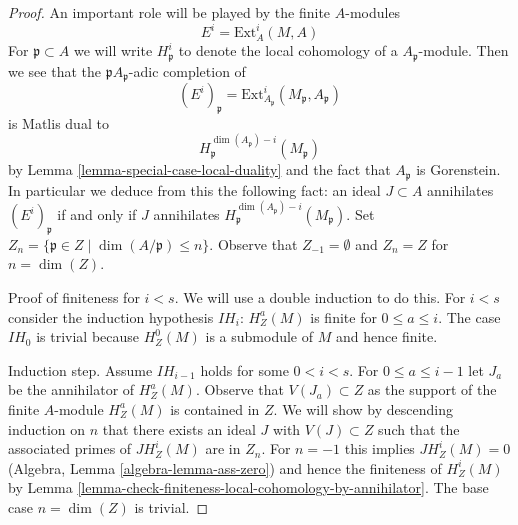 \begin{proof}
An important role will be played by the finite $A$-modules
$$
E^i = \text{Ext}_A^i(M, A)
$$
For $\mathfrak p \subset A$ we will write $H^i_\mathfrak p$ to denote the
local cohomology of a $A_\mathfrak p$-module. Then we see that
the $\mathfrak pA_\mathfrak p$-adic completion of
$$
(E^i)_\mathfrak p = \text{Ext}^i_{A_\mathfrak p}(M_\mathfrak p, A_\mathfrak p)
$$
is Matlis dual to
$$
H^{\dim(A_\mathfrak p) - i}_{\mathfrak p}(M_\mathfrak p)
$$
by Lemma \ref{lemma-special-case-local-duality} and the fact that
$A_\mathfrak p$ is Gorenstein. In particular we deduce from this the
following fact: an ideal $J \subset A$ annihilates
$(E^i)_\mathfrak p$ if and only if $J$ annihilates
$H^{\dim(A_\mathfrak p) - i}_{\mathfrak p}(M_\mathfrak p)$.
Set $Z_n = \{\mathfrak p \in Z \mid \dim(A/\mathfrak p) \leq n\}$.
Observe that $Z_{-1} = \emptyset$ and $Z_n = Z$ for $n = \dim(Z)$.

\medskip\noindent
Proof of finiteness for $i < s$. We will use a double induction to
do this. For $i < s$ consider the induction hypothesis $IH_i$:
$H^a_Z(M)$ is finite for $0 \leq a \leq i$. The case $IH_0$ is trivial
because $H^0_Z(M)$ is a submodule of $M$ and hence finite.

\medskip\noindent
Induction step. Assume $IH_{i - 1}$ holds for some $0 < i < s$.
For $0 \leq a \leq i - 1$ let $J_a$ be the annihilator of
$H^a_Z(M)$. Observe that $V(J_a) \subset Z$ as the support
of the finite $A$-module $H^a_Z(M)$ is contained in $Z$.
We will show by descending induction on $n$ that there
exists an ideal $J$ with $V(J) \subset Z$ such that the
associated primes of $J H^i_Z(M)$ are in $Z_n$.
For $n = -1$ this implies $JH^i_Z(M) = 0$ 
(Algebra, Lemma \ref{algebra-lemma-ass-zero})
and hence the finiteness of $H^i_Z(M)$ by
Lemma \ref{lemma-check-finiteness-local-cohomology-by-annihilator}.
The base case $n = \dim(Z)$ is trivial.


\end{proof}

